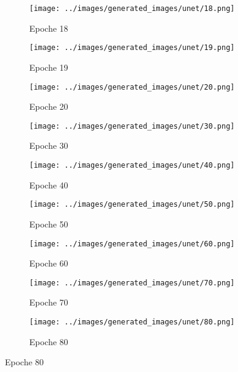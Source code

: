 \begin{figure}[H]
\begin{subfigure}[b]{0.1\textwidth}
 \centering
 \texttt{[image: ../images/generated\_images/unet/18.png]}
 \caption{Epoche 18}
\end{subfigure}
\hspace{1em}%
\begin{subfigure}[b]{0.1\textwidth}
 \centering
 \texttt{[image: ../images/generated\_images/unet/19.png]}
 \caption{Epoche 19}
\end{subfigure}
\hspace{1em}%
\begin{subfigure}[b]{0.1\textwidth}
\centering
\texttt{[image: ../images/generated\_images/unet/20.png]}
\caption{Epoche 20}
\end{subfigure}
\hspace{1em}%
\begin{subfigure}[b]{0.1\textwidth}
 \centering
 \texttt{[image: ../images/generated\_images/unet/30.png]}
 \caption{Epoche 30}
\end{subfigure}
\hspace{1em}%
\begin{subfigure}[b]{0.1\textwidth}
 \centering
 \texttt{[image: ../images/generated\_images/unet/40.png]}
 \caption{Epoche 40}
\end{subfigure}
\hspace{1em}%
\begin{subfigure}[b]{0.1\textwidth}
 \centering
 \texttt{[image: ../images/generated\_images/unet/50.png]}
 \caption{Epoche 50}
\end{subfigure}
\hspace{1em}%
\begin{subfigure}[b]{0.1\textwidth}
\centering
\texttt{[image: ../images/generated\_images/unet/60.png]}
\caption{Epoche 60}
\end{subfigure}
\hspace{1em}%
\begin{subfigure}[b]{0.1\textwidth}
 \centering
 \texttt{[image: ../images/generated\_images/unet/70.png]}
 \caption{Epoche 70}
\end{subfigure}
\hspace{1em}%
\begin{subfigure}[b]{0.1\textwidth}
 \centering
 \texttt{[image: ../images/generated\_images/unet/80.png]}
 \caption{Epoche 80}
\end{subfigure}

\end{figure}
